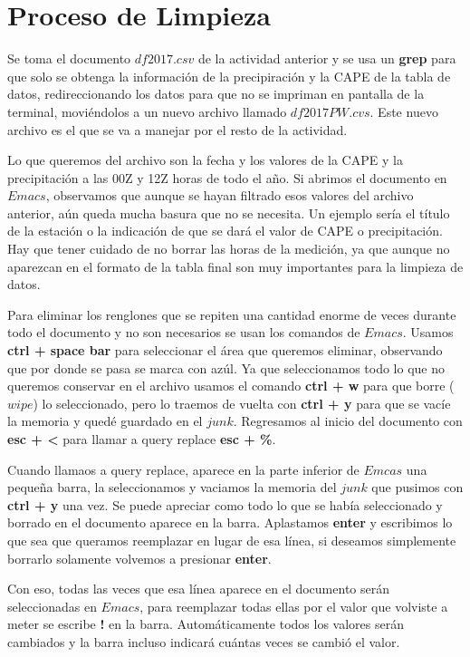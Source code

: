 \documentclass{article}
\begin{document}
\section{Proceso de Limpieza}
Se toma el documento $df2017.csv$ de la actividad anterior y se usa un \textbf{grep} para que solo se obtenga la información de la precipiración y la CAPE de la tabla de datos, redireccionando los datos para que no se impriman en pantalla de la terminal, moviéndolos a un nuevo archivo llamado $df2017 PW.cvs$. Este nuevo archivo es el que se va a manejar por el resto de la actividad.

Lo que queremos del archivo son la fecha y los valores de la CAPE y la precipitación a las 00Z y 12Z horas de todo el año. Si abrimos el documento en $Emacs$, observamos que aunque se hayan filtrado esos valores del archivo anterior, aún queda mucha basura que no se necesita. Un ejemplo sería el título de la estación o la indicación de que se dará el valor de CAPE o precipitación. Hay que tener cuidado de no borrar las horas de la medición, ya que aunque no aparezcan en el formato de la tabla final son muy importantes para la limpieza de datos.

Para eliminar los renglones que se repiten una cantidad enorme de veces durante todo el documento y no son necesarios se usan los comandos de $Emacs$. Usamos \textbf{ctrl + space bar} para seleccionar el área que queremos eliminar, observando que por donde se pasa se marca con azúl. Ya que seleccionamos todo lo que no queremos conservar en el archivo usamos el comando \textbf{ctrl + w} para que borre ($wipe$) lo seleccionado, pero lo traemos de vuelta con \textbf{ctrl + y} para que se vacíe la memoria y quedé guardado en el $junk$. Regresamos al inicio del documento con \textbf{esc + <} para llamar a query replace \textbf{esc + \%}.

Cuando llamaos a query replace, aparece en la parte inferior de $Emcas$ una pequeña barra, la seleccionamos y vaciamos la memoria del $junk$ que pusimos con \textbf{ctrl + y} una vez. Se puede apreciar como todo lo que se había seleccionado y borrado en el documento aparece en la barra. Aplastamos \textbf{enter} y escribimos lo que sea que queramos reemplazar en lugar de esa línea, si deseamos simplemente borrarlo solamente volvemos a presionar \textbf{enter}. 

Con eso, todas las veces que esa línea aparece en el documento serán seleccionadas en $Emacs$, para reemplazar todas ellas por el valor que volviste a meter se escribe \textbf{!} en la barra. Automáticamente todos los valores serán cambiados y la barra incluso indicará cuántas veces se cambió el valor.
\end{document}
